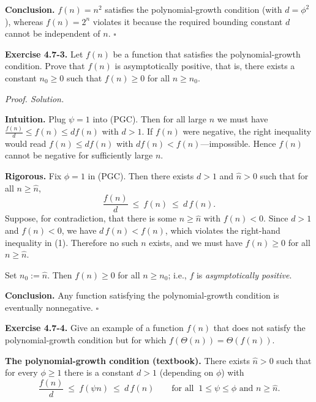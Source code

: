 \documentclass[12pt]{article}
\theoremstyle{definition}
\begin{document}
\medskip
\noindent\textbf{Conclusion.}
$f(n)=n^2$ satisfies the polynomial-growth condition (with $d=\phi^{2}$), whereas $f(n)=2^{n}$ violates it because the required bounding constant $d$ cannot be independent of $n$.
\hfill$\square$


\newpage


\noindent\textbf{Exercise 4.7-3.}
Let $f(n)$ be a function that satisfies the polynomial-growth condition. Prove that $f(n)$ is asymptotically positive, that is, there exists a constant $n_0 \ge 0$ such that $f(n) \ge 0$ for all $n \ge n_0$.

\medskip
\noindent\textit{Proof. Solution.}

\noindent\textbf{Intuition.}
Plug $\psi=1$ into (PGC). Then for all large $n$ we must have
$\frac{f(n)}{d}\le f(n)\le d f(n)$ with $d>1$.
If $f(n)$ were negative, the right inequality would read
$f(n)\le d f(n)$ with $d f(n)<f(n)$—impossible. Hence $f(n)$ cannot be negative
for sufficiently large $n$.

\medskip
\noindent\textbf{Rigorous.}
Fix $\phi=1$ in (PGC). Then there exists $d>1$ and $\hat n>0$ such that for all $n\ge \hat n$,
\[
\frac{f(n)}{d}\ \le\ f(n)\ \le\ d\,f(n).
\tag{1}
\]
Suppose, for contradiction, that there is some $n\ge \hat n$ with $f(n)<0$.
Since $d>1$ and $f(n)<0$, we have $d\,f(n) < f(n)$, which violates the right-hand inequality in (1).
Therefore no such $n$ exists, and we must have $f(n)\ge 0$ for all $n\ge \hat n$.

Set $n_0:=\hat n$. Then $f(n)\ge 0$ for all $n\ge n_0$; i.e., $f$ is \emph{asymptotically positive}.

\medskip
\noindent\textbf{Conclusion.}
Any function satisfying the polynomial-growth condition is eventually nonnegative.
\hfill$\square$

\newpage


\noindent\textbf{Exercise 4.7-4.}
Give an example of a function $f(n)$ that does not satisfy the polynomial-growth
condition but for which $f(\Theta(n))=\Theta(f(n))$.

\medskip
\noindent\textbf{The polynomial-growth condition (textbook).}
There exists $\hat n>0$ such that for every $\phi\ge 1$ there is a constant $d>1$
(depending on $\phi$) with
\[
\frac{f(n)}{d}\ \le\ f(\psi n)\ \le\ d\,f(n)
\qquad\text{for all }~1\le \psi\le \phi\text{ and }n\ge \hat n.
\tag{PGC}
\]
\end{document}
